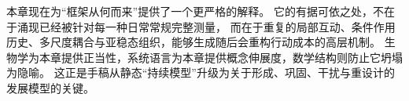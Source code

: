 \begin{summarybox}
本章现在为“框架从何而来”提供了一个更严格的解释。
它的有据可依之处，不在于涌现已经被针对每一种日常常规完整测量，
而在于重复的局部互动、条件作用历史、多尺度耦合与亚稳态组织，能够生成随后会重构行动成本的高层机制。
生物学为本章提供正当性，系统语言为本章提供概念伸展度，数学结构则防止它坍塌为隐喻。
这正是手稿从静态“持续模型”升级为关于形成、巩固、干扰与重设计的发展模型的关键。
\end{summarybox}